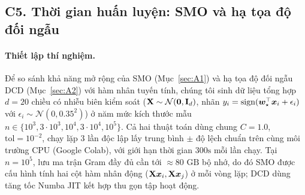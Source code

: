 \subsection{C5. Thời gian huấn luyện: SMO và hạ tọa độ đối ngẫu}\label{sec:C5}

\paragraph{Thiết lập thí nghiệm.}
Để so sánh khả năng mở rộng của SMO (Mục~\ref{sec:A1}) và hạ tọa độ đối ngẫu DCD (Mục~\ref{sec:A2}) với hàm nhân tuyến tính, chúng tôi sinh dữ liệu tổng hợp $d = 20$ chiều có nhiễu biên kiểm soát ($\mathbf{X} \sim \mathcal{N}(\bm{0}, \mathbf{I}_d)$, nhãn $y_i = \operatorname{sign}(\bm{w}_\star^{\top}\bm{x}_i + \epsilon_i)$ với $\epsilon_i \sim \mathcal{N}(0, 0.35^2)$) ở năm mức kích thước mẫu $n \in \{10^3, 3\cdot 10^3, 10^4, 3\cdot 10^4, 10^5\}$. Cả hai thuật toán dùng chung $C = 1.0$, $\mathrm{tol} = 10^{-2}$, chạy lặp 3 lần độc lập lấy trung bình $\pm$ độ lệch chuẩn trên cùng môi trường CPU (Google Colab), với giới hạn thời gian $300\text{s}$ mỗi lần chạy. Tại $n = 10^5$, lưu ma trận Gram đầy đủ cần tới $\approx 80\text{ GB}$ bộ nhớ, do đó SMO được cấu hình tính hai cột hàm nhân động ($\mathbf{X}\bm{x}_i, \mathbf{X}\bm{x}_j$) ở mỗi vòng lặp; DCD dùng tăng tốc Numba JIT kết hợp thu gọn tập hoạt động.

\begin{table}[!htbp]
\centering
\caption{Thời gian huấn luyện trung bình ($\pm$ độ lệch chuẩn qua 3 lần chạy), số bước lặp và hàm mục tiêu đối ngẫu $\Dual(\valpha)$ của SMO tuyến tính và DCD ($d = 20$, $C = 1.0$, $\mathrm{tol} = 10^{-2}$, giới hạn $300\text{s}$).}\label{tab:C5-timing}
\end{table}

